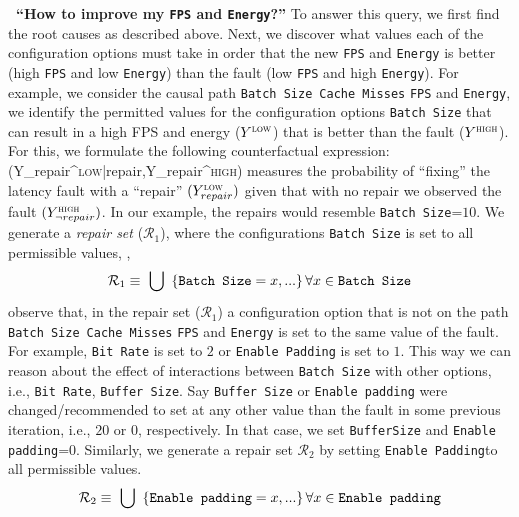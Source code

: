 \noindent\textbf{\faQuestionCircle~\textbf{``How to improve my \texttt{FPS} and \texttt{Energy}?''}} To answer this query, we first find the root causes as described above. Next, we discover what values each of the configuration options must take in order that the new \texttt{FPS} and \texttt{Energy} is better (high \texttt{FPS} and low \texttt{Energy}) than the fault (low \texttt{FPS} and high \texttt{Energy}). For example, we consider the causal path \texttt{Batch Size}~\edgeone \texttt{Cache Misses} \edgeone \texttt{FPS} and \texttt{Energy}, we identify the permitted values for the configuration options {\texttt{Batch Size}} that can result in a high FPS and energy ($Y^{\mathit{\textsc{low}}}$) that is better than the fault ($Y^{\mathit{\textsc{high}}}$).
For this, we formulate the following counterfactual expression: 
\smalleq
\label{eq:cfact_bare}
\footnotesize
{}(Y_{repair}^{\textsc{low}}|\neg repair,Y_{\neg repair}^{\textsc{high}})
\eeq
{} measures the probability of ``fixing'' the latency fault with a ``repair'' {\footnotesize $(Y_{repair}^{\textsc{low}})$} given that with no repair {we observed the fault} {\footnotesize $(Y_{\neg repair}^{\text{\textsc{high}}})$}.   
In our example, the repairs would resemble \texttt{Batch Size}=$10$. We generate a \textit{repair set} ($\mathcal{R}_{1}$), where the configurations \texttt{Batch Size} is set to all permissible values, \ie,
{
\small
\begin{multline}\label{eq:repairs}
    \setlength{\abovedisplayskip}{5pt}
    \setlength{\belowdisplayskip}{5pt}
    \mathcal{R}_{1}\equiv~\bigcup~\left\{\texttt{Batch Size} = {x},... \right\}\forall {x} \in \texttt{Batch Size}
\end{multline}}
observe that, in the repair set ($\mathcal{R}_{1}$) a configuration option that is not on the path \texttt{Batch Size}~\edgeone \texttt{Cache Misses} \edgeone \texttt{FPS} and \texttt{Energy} is set to the same value of the fault. For example, \texttt{Bit Rate} is set to $2$ or \texttt{Enable Padding} is set to $1$. This way we can reason about the effect of interactions between \texttt{Batch Size} with other options, i.e., \texttt{Bit Rate}, \texttt{Buffer Size}. Say \texttt{Buffer Size} or \texttt{Enable padding} were changed/recommended to set at any other value than the fault in some previous iteration, i.e., $20$ or $0$, respectively. In that case, we set \texttt{BufferSize} and \texttt{Enable padding}=$0$. Similarly, we generate a repair set $\mathcal{R}_{2}$ by setting \texttt{Enable Padding}to all permissible values. 
{
\small
\begin{multline}\label{eq:repairs}
    \setlength{\abovedisplayskip}{5pt}
    \setlength{\belowdisplayskip}{5pt}
    \mathcal{R}_{2}\equiv~\bigcup~\left\{\texttt{Enable padding} = {x},... \right\} \forall {x} \in \texttt{Enable padding}
\end{multline}}


